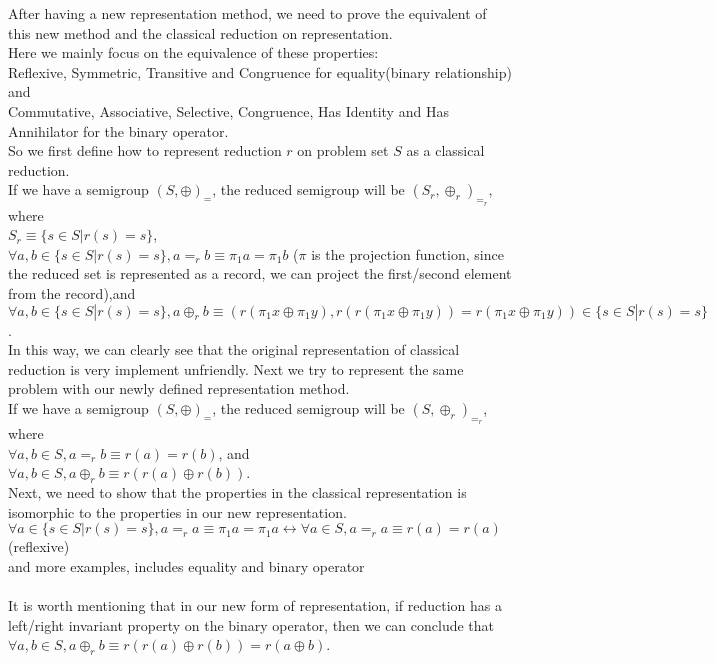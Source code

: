 \documentclass[a4paper,10pt]{article}
\begin{document}
After having a new representation method, we need to prove the equivalent of this new method and the classical reduction on representation.\\
Here we mainly focus on the equivalence of these properties:\\
Reflexive, Symmetric, Transitive and Congruence for equality(binary relationship) and\\
Commutative, Associative, Selective, Congruence, Has Identity and Has Annihilator for the binary operator.\\
So we first define how to represent reduction $r$ on problem set $S$ as a classical reduction.\\
If we have a semigroup $(S,\oplus)_=$, the reduced semigroup will be $(S_r,\oplus_r)_{=_r}$, where\\
$S_r \equiv \{s\in S|r(s)= s\}$, \\ 
$\forall a,b \in \{s\in S|r(s)= s\}, a =_r b \equiv \pi_1a = \pi_1 b$ ($\pi$ is the projection function, since the reduced set is represented as a record, we can project the first/second element from the record),and\\
$\forall a,b \in \{s\in S|r(s)= s\}, a \oplus_r b \equiv (r(\pi_1x \oplus \pi_1y), r(r(\pi_1x \oplus \pi_1y)) = r(\pi_1x \oplus \pi_1y)) \in \{s\in S|r(s)= s\}$.\\
In this way, we can clearly see that the original representation of classical reduction is very implement unfriendly.
Next we try to represent the same problem with our newly defined representation method.\\
If we have a semigroup $(S,\oplus)_=$, the reduced semigroup will be $(S,\oplus_r)_{=_r}$, where\\
$\forall a,b \in S, a =_r b \equiv r(a) = r(b)$, and\\
$\forall a,b \in S, a \oplus_r b \equiv  r(r (a) \oplus r(b))$.\\
Next, we need to show that the properties in the classical representation is isomorphic to the properties in our new representation.\\
$\forall a \in \{s\in S|r(s)= s\}, a =_r a \equiv \pi_1a = \pi_1 a \longleftrightarrow \forall a \in S, a =_r a \equiv r(a) = r(a)$ (reflexive)\\
and more examples, includes equality and binary operator\\\\
It is worth mentioning that in our new form of representation, if reduction has a left/right invariant property on the binary operator, then we can conclude that $\forall a,b \in S, a \oplus_r b \equiv  r(r (a) \oplus r(b)) = r (a \oplus b)$. 
\end{document}
